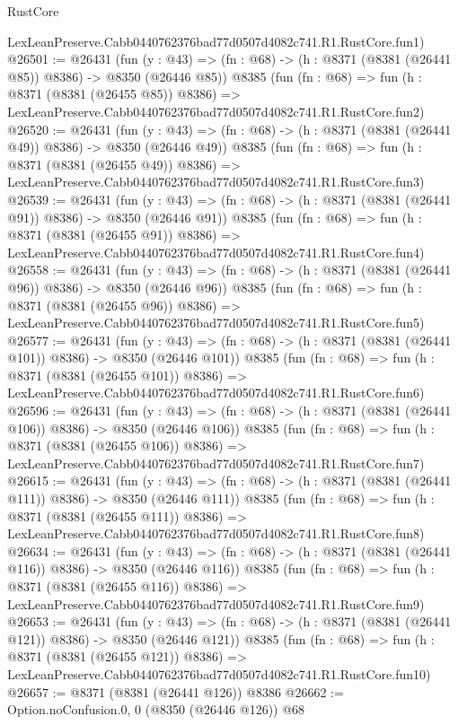 \begin{lexlean}{RustCore}
\begin{coremodule}
    LexLeanPreserve.Cabb0440762376bad77d0507d4082c741.R1.RustCore.fun1)
@26501 := @26431
    (fun (y : @43) => (fn : @68) -> (h : @8371 (@8381 (@26441 @85)) @8386) -> @8350 (@26446 @85))
    @8385
    (fun (fn : @68) =>
    fun (h : @8371 (@8381 (@26455 @85)) @8386) =>
    LexLeanPreserve.Cabb0440762376bad77d0507d4082c741.R1.RustCore.fun2)
@26520 := @26431
    (fun (y : @43) => (fn : @68) -> (h : @8371 (@8381 (@26441 @49)) @8386) -> @8350 (@26446 @49))
    @8385
    (fun (fn : @68) =>
    fun (h : @8371 (@8381 (@26455 @49)) @8386) =>
    LexLeanPreserve.Cabb0440762376bad77d0507d4082c741.R1.RustCore.fun3)
@26539 := @26431
    (fun (y : @43) => (fn : @68) -> (h : @8371 (@8381 (@26441 @91)) @8386) -> @8350 (@26446 @91))
    @8385
    (fun (fn : @68) =>
    fun (h : @8371 (@8381 (@26455 @91)) @8386) =>
    LexLeanPreserve.Cabb0440762376bad77d0507d4082c741.R1.RustCore.fun4)
@26558 := @26431
    (fun (y : @43) => (fn : @68) -> (h : @8371 (@8381 (@26441 @96)) @8386) -> @8350 (@26446 @96))
    @8385
    (fun (fn : @68) =>
    fun (h : @8371 (@8381 (@26455 @96)) @8386) =>
    LexLeanPreserve.Cabb0440762376bad77d0507d4082c741.R1.RustCore.fun5)
@26577 := @26431
    (fun (y : @43) => (fn : @68) -> (h : @8371 (@8381 (@26441 @101)) @8386) -> @8350 (@26446 @101))
    @8385
    (fun (fn : @68) =>
    fun (h : @8371 (@8381 (@26455 @101)) @8386) =>
    LexLeanPreserve.Cabb0440762376bad77d0507d4082c741.R1.RustCore.fun6)
@26596 := @26431
    (fun (y : @43) => (fn : @68) -> (h : @8371 (@8381 (@26441 @106)) @8386) -> @8350 (@26446 @106))
    @8385
    (fun (fn : @68) =>
    fun (h : @8371 (@8381 (@26455 @106)) @8386) =>
    LexLeanPreserve.Cabb0440762376bad77d0507d4082c741.R1.RustCore.fun7)
@26615 := @26431
    (fun (y : @43) => (fn : @68) -> (h : @8371 (@8381 (@26441 @111)) @8386) -> @8350 (@26446 @111))
    @8385
    (fun (fn : @68) =>
    fun (h : @8371 (@8381 (@26455 @111)) @8386) =>
    LexLeanPreserve.Cabb0440762376bad77d0507d4082c741.R1.RustCore.fun8)
@26634 := @26431
    (fun (y : @43) => (fn : @68) -> (h : @8371 (@8381 (@26441 @116)) @8386) -> @8350 (@26446 @116))
    @8385
    (fun (fn : @68) =>
    fun (h : @8371 (@8381 (@26455 @116)) @8386) =>
    LexLeanPreserve.Cabb0440762376bad77d0507d4082c741.R1.RustCore.fun9)
@26653 := @26431
    (fun (y : @43) => (fn : @68) -> (h : @8371 (@8381 (@26441 @121)) @8386) -> @8350 (@26446 @121))
    @8385
    (fun (fn : @68) =>
    fun (h : @8371 (@8381 (@26455 @121)) @8386) =>
    LexLeanPreserve.Cabb0440762376bad77d0507d4082c741.R1.RustCore.fun10)
@26657 := @8371 (@8381 (@26441 @126)) @8386
@26662 := Option.noConfusion.{0, 0} (@8350 (@26446 @126)) @68

\end{coremodule}
\end{lexlean}
